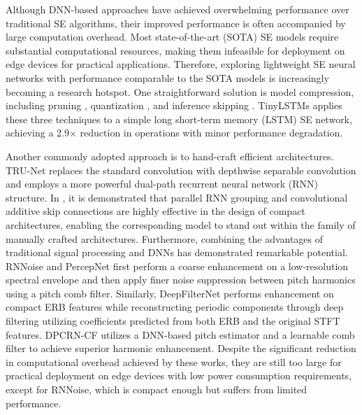 \documentclass[journal]{IEEEtran}
\begin{document}
Although DNN-based approaches have achieved overwhelming performance over traditional SE algorithms, their improved performance is often accompanied by large computation overhead. Most state-of-the-art (SOTA) SE models require substantial computational resources, making them infeasible for deployment on edge devices for practical applications. Therefore, exploring lightweight SE neural networks with performance comparable to the SOTA models is increasingly becoming a research hotspot. One straightforward solution is model compression, including pruning \cite{Pruning3}, quantization \cite{Towrards_SE_Compression}, and inference skipping \cite{Skip-DPCRN}. TinyLSTMs \cite{TinyLSTMs} applies these three techniques to a simple long short-term memory (LSTM) SE network, achieving a 2.9$\times$ reduction in operations with minor performance degradation. 

Another commonly adopted approach is to hand-craft efficient architectures. TRU-Net \cite{TRUNet} replaces the standard convolution with depthwise separable convolution and employs a more powerful dual-path recurrent neural network (RNN) structure. In \cite{EfficientSE}, it is demonstrated that parallel RNN grouping and convolutional additive skip connections are highly effective in the design of compact architectures, enabling the corresponding model to stand out within the family of manually crafted architectures. Furthermore, combining the advantages of traditional signal processing and DNNs has demonstrated remarkable potential. RNNoise \cite{RNNoise} and PercepNet \cite{PercepNet} first perform a coarse enhancement on a low-resolution spectral envelope and then apply finer noise suppression between pitch harmonics using a pitch comb filter. Similarly, DeepFilterNet \cite{DeepFilterNet, DeepFilterNetV2} performs enhancement on compact ERB features while reconstructing periodic components through deep filtering utilizing coefficients predicted from both ERB and the original STFT features. DPCRN-CF \cite{DPCRN-CF} utilizes a DNN-based pitch estimator and a learnable comb filter to achieve superior harmonic enhancement. Despite the significant reduction in computational overhead achieved by these works, they are still too large for practical deployment on edge devices with low power consumption requirements, except for RNNoise, which is compact enough but suffers from limited performance.
\end{document}
